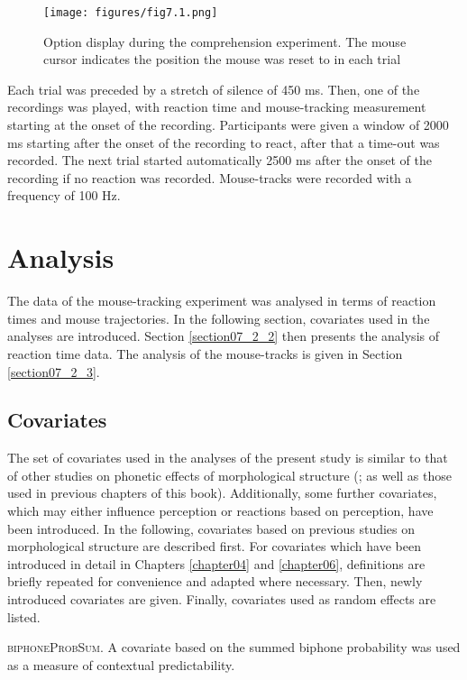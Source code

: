 \begin{figure}
    \centering
    \texttt{[image: figures/fig7.1.png]}
    \caption{Option display during the comprehension experiment. The mouse cursor indicates the position the mouse was reset to in each trial}
    \label{fig:7_1}
\end{figure}

Each trial was preceded by a stretch of silence of 450 ms. Then, one of the recordings was played, with reaction time and mouse-tracking measurement starting at the onset of the recording. Participants were given a window of 2000 ms starting after the onset of the recording to react, after that a time-out was recorded. The next trial started automatically 2500 ms after the onset of the recording if no reaction was recorded. Mouse-tracks were recorded with a frequency of 100 Hz.

\section{Analysis}\label{section07_2}

The data of the mouse-tracking experiment was analysed in terms of reaction times and mouse trajectories. In the following section, covariates used in the analyses are introduced. Section \ref{section07_2_2} then presents the analysis of reaction time data. The analysis of the mouse-tracks is given in Section \ref{section07_2_3}.

\subsection{Covariates}\label{section07_2_1}

The set of covariates used in the analyses of the present study is similar to that of other studies on phonetic effects of morphological structure (\cite{Pluymaekers2005a, Pluymaekers2005b, Hanique2013Ernestus, Plag2017}; as well as those used in previous chapters of this book). Additionally, some further covariates, which may either influence perception or reactions based on perception, have been introduced. In the following, covariates based on previous studies on morphological structure are described first. For covariates which have been introduced in detail in Chapters \ref{chapter04} and \ref{chapter06}, definitions are briefly repeated for convenience and adapted where necessary. Then, newly introduced covariates are given. Finally, covariates used as random effects are listed.

\textsc{biphoneProbSum}. A covariate based on the summed biphone probability was used as a measure of contextual predictability.

